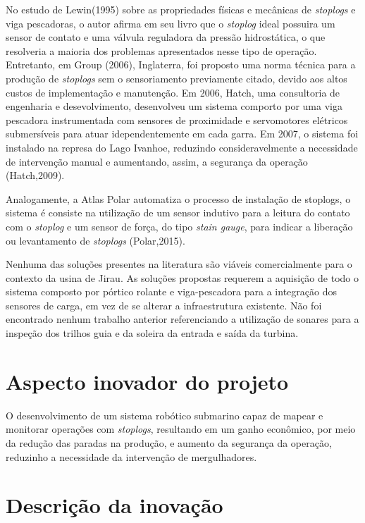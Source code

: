 No estudo de Lewin(1995) sobre as propriedades físicas e mecânicas de 
\textit{stoplogs} e viga pescadoras, o autor afirma em seu livro que o
\textit{stoplog} ideal possuira um sensor de contato e uma válvula reguladora da
pressão hidrostática, o que resolveria a maioria dos problemas apresentados
nesse tipo de operação. Entretanto, em Group (2006), Inglaterra, foi proposto
uma norma técnica para a produção de \textit{stoplogs} sem o sensoriamento
previamente citado, devido aos altos custos de implementação e manutenção. Em
2006, Hatch, uma consultoria de engenharia e desevolvimento, desenvolveu um
sistema comporto por uma viga pescadora instrumentada com sensores de
proximidade e servomotores elétricos submersíveis para atuar idependentemente em
cada garra. Em 2007, o sistema foi instalado na represa do Lago Ivanhoe,
reduzindo consideravelmente a necessidade de intervenção manual e aumentando,
assim, a segurança da operação (Hatch,2009).

Analogamente, a Atlas Polar automatiza o processo de instalação de
stoplogs, o sistema é consiste na utilização de um sensor indutivo para a
leitura do contato com o \textit{stoplog} e um sensor de força, do tipo
\textit{stain gauge}, para indicar a liberação ou levantamento de
\textit{stoplogs} (Polar,2015).

Nenhuma das soluções presentes na literatura são viáveis comercialmente para o
contexto da usina de Jirau. As soluções propostas requerem a aquisição de todo o
sistema composto por pórtico rolante e viga-pescadora para a integração dos
sensores de carga, em vez de se alterar a infraestrutura existente. Não foi
encontrado nenhum trabalho anterior referenciando a utilização de sonares para a
inspeção dos trilhos guia e da soleira da entrada e saída da turbina.

\section{Aspecto inovador do projeto}

O desenvolvimento de um sistema robótico submarino capaz de mapear e monitorar
operações com \textit{stoplogs}, resultando em um ganho econômico, por meio da
redução das paradas na produção, e aumento da segurança da operação,
reduzinho a necessidade da intervenção de mergulhadores.

\section{Descrição da inovação}

